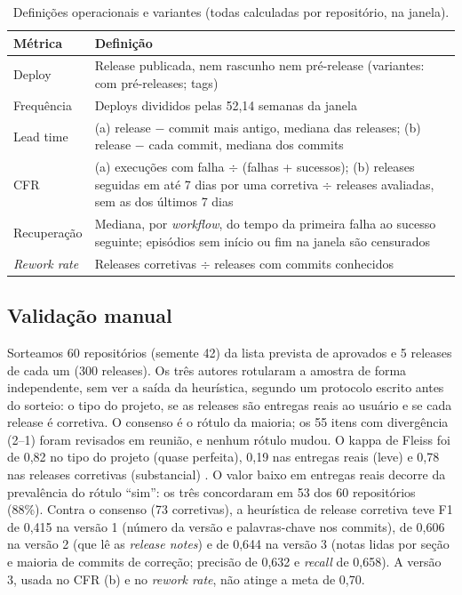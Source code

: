 \begin{table}[ht]
\centering
\footnotesize
\caption{Definições operacionais e variantes (todas calculadas por repositório, na janela).}
\label{tab:definicoes}
\begin{tabular}{p{}p{}}
\hline
Métrica & Definição \\
\hline
Deploy & Release publicada, nem rascunho nem pré-release (variantes: com pré-releases; tags) \\
Frequência & Deploys divididos pelas 52,14 semanas da janela \\
Lead time & (a) release $-$ commit mais antigo, mediana das releases; (b) release $-$ cada commit, mediana dos commits \\
CFR & (a) execuções com falha $\div$ (falhas + sucessos); (b) releases seguidas em até 7 dias por uma corretiva $\div$ releases avaliadas, sem as dos últimos 7 dias \\
Recuperação & Mediana, por \textit{workflow}, do tempo da primeira falha ao sucesso seguinte; episódios sem início ou fim na janela são censurados \\
\textit{Rework rate} & Releases corretivas $\div$ releases com commits conhecidos \\
\hline
\end{tabular}
\end{table}

\subsection{Validação manual}
\label{sec:validacao}

Sorteamos 60 repositórios (semente 42) da lista prevista de aprovados e 5 releases de cada um (300 releases). Os três autores rotularam a amostra de forma independente, sem ver a saída da heurística, segundo um protocolo escrito antes do sorteio: o tipo do projeto, se as releases são entregas reais ao usuário e se cada release é corretiva. O consenso é o rótulo da maioria; os 55 itens com divergência (2--1) foram revisados em reunião, e nenhum rótulo mudou. O kappa de Fleiss foi de 0,82 no tipo do projeto (quase perfeita), 0,19 nas entregas reais (leve) e 0,78 nas releases corretivas (substancial) \cite{landis1977measurement}. O valor baixo em entregas reais decorre da prevalência do rótulo ``sim'': os três concordaram em 53 dos 60 repositórios (88\%). Contra o consenso (73 corretivas), a heurística de release corretiva teve F1 de 0,415 na versão 1 (número da versão e palavras-chave nos commits), de 0,606 na versão 2 (que lê as \textit{release notes}) e de 0,644 na versão 3 (notas lidas por seção e maioria de commits de correção; precisão de 0,632 e \textit{recall} de 0,658). A versão 3, usada no CFR (b) e no \textit{rework rate}, não atinge a meta de 0,70.

